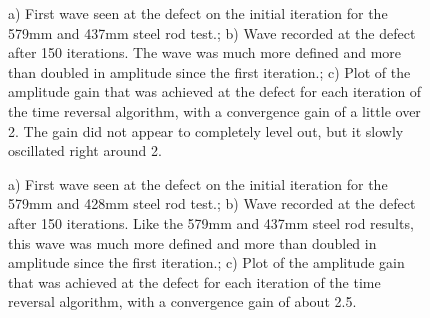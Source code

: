 \documentclass[11pt,letterpaper]{article}%
\begin{document}
 \begin{figure}
\begin{subfigmatrix}{3}
\end{subfigmatrix}

   \caption[all]
   { \label{steelExp1}
   a) First wave seen at the defect on the initial iteration for the 579mm and 437mm steel rod test.; b) Wave recorded at the defect after 150 iterations. The wave was much more defined and more than doubled in amplitude since the first iteration.; c) Plot of the amplitude gain that was achieved at the defect for each iteration of the time reversal algorithm, with a convergence gain of a little over 2. The gain did not appear to completely level out, but it slowly oscillated right around 2.
 }
\end{figure}

 \begin{figure}
\begin{subfigmatrix}{3}
\end{subfigmatrix}

   \caption[all]
   { \label{steelExp2}
   a) First wave seen at the defect on the initial iteration for the 579mm and 428mm steel rod test.; b) Wave recorded at the defect after 150 iterations. Like the 579mm and 437mm steel rod results, this wave was much more defined and more than doubled in amplitude since the first iteration.; c) Plot of the amplitude gain that was achieved at the defect for each iteration of the time reversal algorithm, with a convergence gain of about 2.5.
 }
\end{figure}
\end{document}
